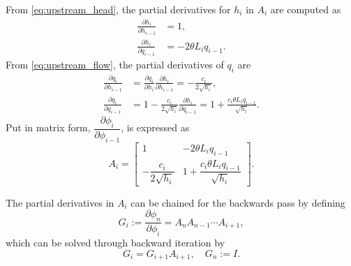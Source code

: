 From \cref{eq:upstream_head}, the partial derivatives for $h_i$ in $A_i$ are computed as
\begin{align*}
    \frac{\partial h_i}{\partial h_{i-1}} &= 1, \\
    \frac{\partial h_i}{\partial q_{i-1}} &= -2 \theta L_i q_{i-1}.
\end{align*}
From \cref{eq:upstream_flow}, the partial derivatives of $q_i$ are
\begin{align*}
    \frac{\partial q_i}{\partial h_{i-1}} &= \frac{\partial q_i}{\partial h_{i}}\frac{\partial h_i}{\partial h_{i-1}} = -\frac{c_i}{2 \sqrt{h_{i}}}, \\
    \frac{\partial q_i}{\partial q_{i-1}} &= 1 - \frac{c_i}{2 \sqrt{h_i}}\frac{\partial h_i}{\partial q_{i-1}}
    = 1+\frac{c_i \theta L_i q_{i-1}}{\sqrt{h_i}}.
\end{align*}
Put in matrix form, $\dfrac{\partial \phi_i}{\partial \phi_{i-1}}$, is expressed as 
\begin{equation}
\label{eq:A_i}
A_i=\begin{bmatrix}
    1 & -2 \theta L_i q_{i-1} \\[0.4em]
    -\dfrac{c_i}{2 \sqrt{h_{i}}} & 1+\dfrac{c_i \theta L_i q_{i-1}}{\sqrt{h_i}}
\end{bmatrix}.
\end{equation}

The partial derivatives in $A_i$ can be chained for the backwards pass by defining
\begin{equation*}
    G_i := \frac{\partial \phi_n}{\partial \phi_i} = A_n A_{n-1} \cdots A_{i+1},
\end{equation*}
which can be solved through backward iteration by
\begin{equation*}
    G_i = G_{i+1}A_{i+1}, \quad G_n:=I.
\end{equation*}

